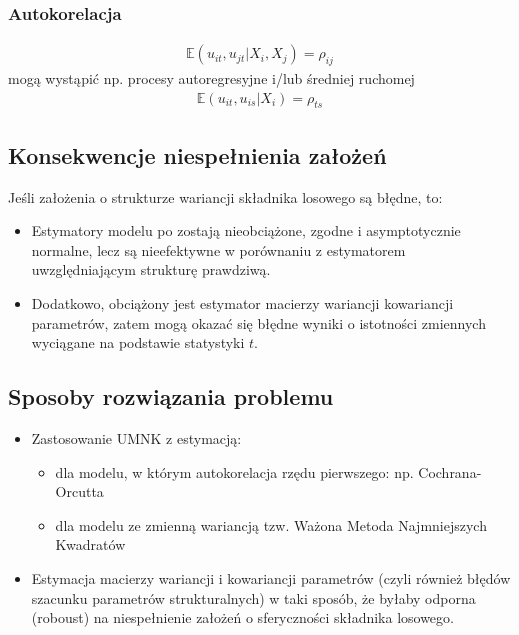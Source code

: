 \subsubsection{Autokorelacja}
\begin{gather*}
\mathbb E (u_{it},u_{jt}|X_i,X_j)=\rho_{ij}
\end{gather*}
mogą wystąpić np. procesy autoregresyjne i/lub średniej ruchomej
\begin{gather*}
\mathbb E (u_{it},u_{is}|X_i)=\rho_{ts}
\end{gather*}
\subsection{Konsekwencje niespełnienia założeń}
Jeśli założenia o strukturze wariancji składnika losowego są błędne, to:
\begin{itemize}
\item Estymatory modelu po zostają nieobciążone, zgodne i asymptotycznie normalne, lecz są nieefektywne w porównaniu z estymatorem uwzględniającym strukturę prawdziwą.
\item Dodatkowo, obciążony jest estymator macierzy wariancji kowariancji parametrów, zatem mogą okazać się błędne wyniki o istotności zmiennych wyciągane na podstawie statystyki $ t $.
\end{itemize}
\subsection{Sposoby rozwiązania problemu}
\begin{itemize}
\item Zastosowanie UMNK z estymacją:
\begin{itemize}
\item dla modelu, w którym autokorelacja rzędu pierwszego: np. Cochrana-Orcutta
\item dla modelu ze zmienną wariancją tzw. Ważona Metoda Najmniejszych Kwadratów
\end{itemize}
\item Estymacja macierzy wariancji i kowariancji parametrów (czyli również błędów szacunku parametrów strukturalnych) w taki sposób, że byłaby odporna (roboust) na niespełnienie założeń o sferyczności składnika losowego.
\end{itemize}
